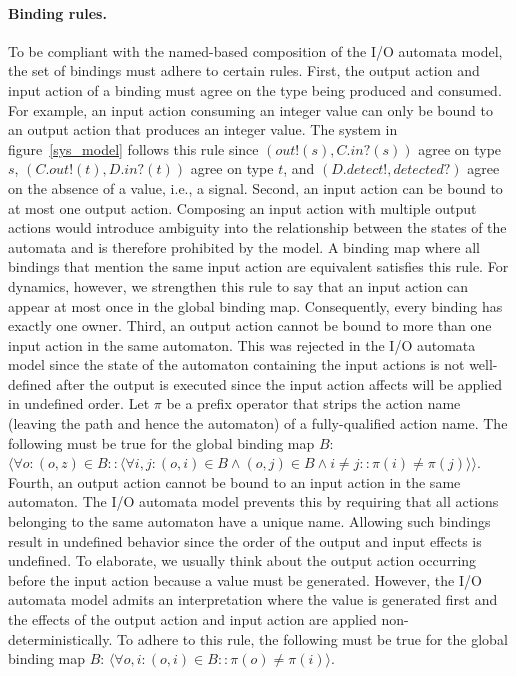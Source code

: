 \paragraph{Binding rules.}
To be compliant with the named-based composition of the I/O automata model, the set of bindings must adhere to certain rules.
First, the output action and input action of a binding must agree on the type being produced and consumed.
For example, an input action consuming an integer value can only be bound to an output action that produces an integer value.
The system in figure~\ref{sys_model} follows this rule since $(out!(s), C.in?(s))$ agree on type $s$, $(C.out!(t), D.in?(t))$ agree on type $t$, and $(D.detect!, detected?)$ agree on the absence of a value, i.e., a signal.
Second, an input action can be bound to at most one output action.
Composing an input action with multiple output actions would introduce ambiguity into the relationship between the states of the automata and is therefore prohibited by the model.
A binding map where all bindings that mention the same input action are equivalent satisfies this rule.
For dynamics, however, we strengthen this rule to say that an input action can appear at most once in the global binding map.
Consequently, every binding has exactly one owner.
Third, an output action cannot be bound to more than one input action in the same automaton.
This was rejected in the I/O automata model since the state of the automaton containing the input actions is not well-defined after the output is executed since the input action affects will be applied in undefined order.
Let $\pi$ be a prefix operator that strips the action name (leaving the path and hence the automaton) of a fully-qualified action name.
The following must be true for the global binding map $B$:  $\langle \forall o : (o, z) \in B :: \langle \forall i,j : (o, i) \in B \land (o, j) \in B \land i \neq j:: \pi (i) \neq \pi (j) \rangle \rangle$.
Fourth, an output action cannot be bound to an input action in the same automaton.
The I/O automata model prevents this by requiring that all actions belonging to the same automaton have a unique name.
Allowing such bindings result in undefined behavior since the order of the output and input effects is undefined.
To elaborate, we usually think about the output action occurring before the input action because a value must be generated.
However, the I/O automata model admits an interpretation where the value is generated first and the effects of the output action and input action are applied non-deterministically.
To adhere to this rule, the following must be true for the global binding map $B$:  $\langle \forall o, i : (o, i) \in B :: \pi (o) \neq \pi (i) \rangle$.


